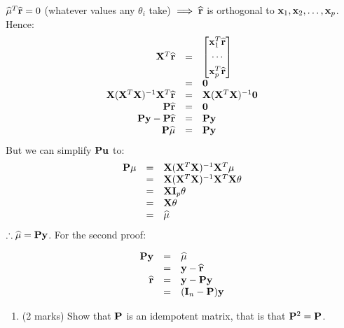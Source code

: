 \documentclass[9pt,letter]{article}
\providecommand{\tightlist}{%
  \setlength{\itemsep}{0pt}\setlength{\parskip}{0pt}}
\begin{document}
\(\widehat{\bf \mu}^T \widehat{\bf r} = 0\) (whatever values any
\(\theta_i\) take) \(\implies \widehat{\bf r}\) is orthogonal to
\({\bf x}_1, {\bf x}_2, \ldots, {\bf x}_p\). Hence: \[
\begin{array}{rcl}
{\bf X}^T \widehat{\bf r} &=& \begin{bmatrix}
                                {\bf x}_1^T\widehat{\bf r}\\[0.3em]
                                \cdots\\[0.3em]
                                {\bf x}_p^T\widehat{\bf r}
                              \end{bmatrix}\\
&=& {\bf 0}\\
{\bf X}({\bf X}^T{\bf X})^{-1}{\bf X}^T\widehat{\bf r} &=& {\bf X}({\bf X}^T{\bf X})^{-1}{\bf 0}\\
{\bf P}\widehat{\bf r} &=& {\bf 0}\\
{\bf P}{\bf y} - {\bf P}\widehat{\bf r} &=& {\bf P}{\bf y}\\
{\bf P}\widehat{\bf \mu} &=& {\bf P}{\bf y}
\end{array}
\] But we can simplify \({\bf P}{\bf u}\) to: \[
\begin{array}{rcl}
{\bf P}{\bf \mu} &=& {\bf X}({\bf X}^T{\bf X})^{-1}{\bf X}^T{\bf \mu}\\
&=& {\bf X}({\bf X}^T{\bf X})^{-1}{\bf X}^T{\bf X}{\bf \theta}\\
&=& {\bf X}{\bf I}_p{\bf \theta}\\
&=& {\bf X}{\bf \theta}\\
&=& \widehat{\bf \mu}
\end{array}
\] \(\therefore \widehat{\bf \mu} = {\bf P}{\bf y}\). For the second
proof:

\[
\begin{array}{rcl}
{\bf P}{\bf y} &=& \widehat{\bf \mu}\\
&=& {\bf y} - \widehat{\bf r}\\
\widehat{\bf r} &=& {\bf y} - {\bf P}{\bf y}\\
&=& ({\bf I}_n -{\bf P}){\bf y}
\end{array}
\]

\begin{enumerate}
\def\labelenumi{(\alph{enumi})}
\setcounter{enumi}{1}
\tightlist
\item
  (2 marks) Show that \({\bf P}\) is an idempotent matrix, that is that
  \({\bf P}^2={\bf P}\).
\end{enumerate}
\end{document}
